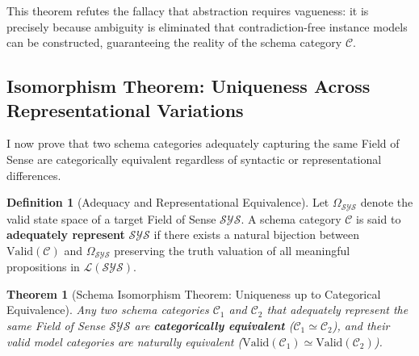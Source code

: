 \documentclass[11pt,a4paper]{article}
\theoremstyle{definition}
\newtheorem{definition}{Definition}[section]
\theoremstyle{plain}
\newtheorem{theorem}{Theorem}[section]
\theoremstyle{remark}
\newcommand{\Valid}{\mathrm{Valid}}
\begin{document}
This theorem refutes the fallacy that abstraction requires vagueness: it is precisely because ambiguity is eliminated that contradiction-free instance models can be constructed, guaranteeing the reality of the schema category $\mathcal{C}$.

\subsection{Isomorphism Theorem: Uniqueness Across Representational Variations}
I now prove that two schema categories adequately capturing the same Field of Sense are categorically equivalent regardless of syntactic or representational differences.

\begin{definition}[Adequacy and Representational Equivalence]\label{def:adequacy}
Let $\Omega_{\mathcal{SYS}}$ denote the valid state space of a target Field of Sense $\mathcal{SYS}$. A schema category $\mathcal{C}$ is said to \textbf{adequately represent} $\mathcal{SYS}$ if there exists a natural bijection between $\Valid(\mathcal{C})$ and $\Omega_{\mathcal{SYS}}$ preserving the truth valuation of all meaningful propositions in $\mathcal{L}(\mathcal{SYS})$.
\end{definition}

\begin{theorem}[Schema Isomorphism Theorem: Uniqueness up to Categorical Equivalence]\label{thm:isomorphism}
Any two schema categories $\mathcal{C}_1$ and $\mathcal{C}_2$ that adequately represent the same Field of Sense $\mathcal{SYS}$ are \textbf{categorically equivalent} ($\mathcal{C}_1 \simeq \mathcal{C}_2$), and their valid model categories are naturally equivalent ($\Valid(\mathcal{C}_1) \simeq \Valid(\mathcal{C}_2)$).
\end{theorem}
\end{document}
